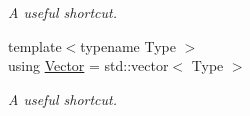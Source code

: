 \begin{DoxyCompactItemize}
\begin{DoxyCompactList}\small\item\em A useful shortcut. \end{DoxyCompactList}\item 
{\footnotesize template$<$typename Type $>$ }\\using \hyperlink{classblmc__drivers_1_1MotorBoardInterface_abeb474bef6d85dffcd5227e5ea965cc5}{Vector} = std\+::vector$<$ Type $>$\hypertarget{classblmc__drivers_1_1MotorBoardInterface_abeb474bef6d85dffcd5227e5ea965cc5}{}\label{classblmc__drivers_1_1MotorBoardInterface_abeb474bef6d85dffcd5227e5ea965cc5}

\begin{DoxyCompactList}\small\item\em A useful shortcut. \end{DoxyCompactList}\end{DoxyCompactItemize}
